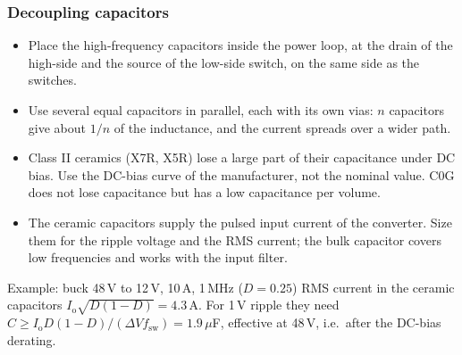 \begin{frame}
	\frametitle{Decoupling capacitors}
	\begin{itemize}
		\item Place the high-frequency capacitors inside the power loop, at the drain of the high-side and the source of the low-side switch, on the same side as the switches.
		\item Use several equal capacitors in parallel, each with its own vias: $n$ capacitors give about $1/n$ of the inductance, and the current spreads over a wider path.
		\item Class II ceramics (X7R, X5R) lose a large part of their capacitance under DC bias. Use the DC-bias curve of the manufacturer, not the nominal value. C0G does not lose capacitance but has a low capacitance per volume.
		\item The ceramic capacitors supply the pulsed input current of the converter. Size them for the ripple voltage and the RMS current; the bulk capacitor covers low frequencies and works with the input filter.
	\end{itemize}
	\begin{block}{Example: buck 48\,V to 12\,V, 10\,A, 1\,MHz ($D=0.25$)}
		RMS current in the ceramic capacitors $I_\mathrm{o}\sqrt{D(1-D)}=4.3$\,A. For 1\,V ripple they need
		$C\geq I_\mathrm{o}D(1-D)/(\Delta V f_\mathrm{sw})=1.9\,\mu$F, effective at 48\,V, i.e.\ after the DC-bias derating.
	\end{block}
\end{frame}

